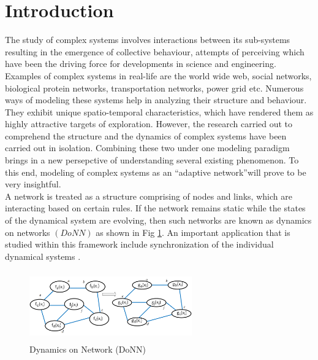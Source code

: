 \documentclass{ifacconf}
\begin{document}
\section{Introduction}
%
%
The study of complex systems involves interactions between its sub-systems resulting in the emergence of collective behaviour, attempts of perceiving which have been the driving force for developments in science and engineering. Examples of complex systems in real-life are the world wide web, social networks, biological protein networks, transportation networks, power grid etc. Numerous ways of modeling these systems help in analyzing their structure and behaviour. They exhibit unique spatio-temporal characteristics, which have rendered them as highly attractive targets of exploration. However, the research carried out to comprehend the structure and the dynamics of complex systems have been carried out in isolation. Combining these two under one modeling paradigm brings in a new persepctive of understanding several existing phenomenon. To this end, modeling of complex systems as an \textquotedblleft adaptive network\textquotedblright  will prove to be very insightful.\\
A network is treated as a structure comprising of nodes and links, which are interacting based on certain rules. If the network remains static while the states of the dynamical system are evolving, then such networks are known as dynamics on networks $(DoNN)$ as shown in Fig \ref {fig:2}. An important application that is studied within this framework include synchronization of the individual dynamical systems \citep{Strot}.
\begin{figure}[h!]
\begin{center}
\includegraphics[width=7cm,height=3cm]{fig2.png}
\caption{Dynamics on Network (DoNN)}
\label{fig:2}
\end{center}
\end{figure}
\end{document}
